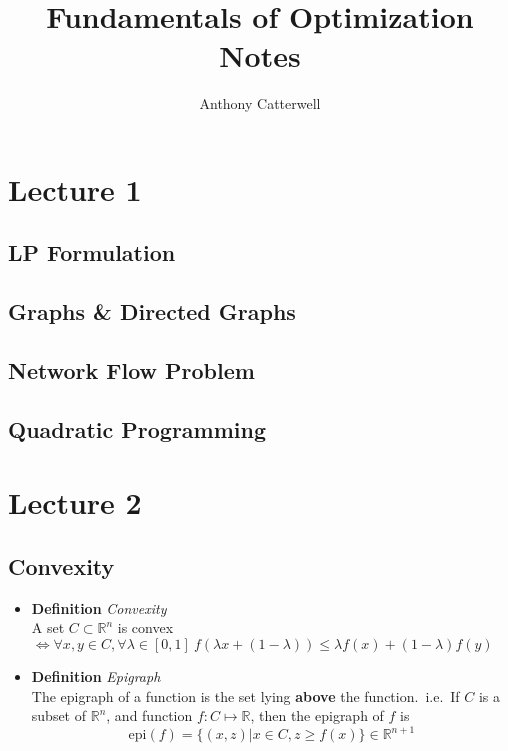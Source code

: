 \documentclass[11pt,a4paper]{article}
\title{Fundamentals of Optimization Notes}
\author{Anthony Catterwell}
\begin{document}
\maketitle
\tableofcontents

\section{Lecture 1}

\subsection{LP Formulation}
\subsection{Graphs \& Directed Graphs}
\subsection{Network Flow Problem}
\subsection{Quadratic Programming}


\section{Lecture 2}

\subsection{Convexity}
\begin{itemize}
    \item \textbf{Definition} \emph{Convexity} \\
        A set $C \subset \mathbb{R}^n$ is convex
        $\iff \forall x, y \in C, \forall \lambda \in [0, 1] \ f(\lambda x + (1 - \lambda))
        \leq \lambda f(x) + (1 - \lambda) f(y)$

    \item \textbf{Definition} \emph{Epigraph} \\
        The epigraph of a function is the set lying \textbf{above} the function.\
        i.e.\ If $C$ is a subset of $\mathbb{R}^n$, and function $f : C \mapsto \mathbb{R}$,
        then the epigraph of $f$ is
        \[
            \mathrm{epi}(f) = \{ (x, z) | x \in C, z \geq f(x) \} \in \mathbb{R}^{n+1}
        \]
\end{itemize}
\end{document}
